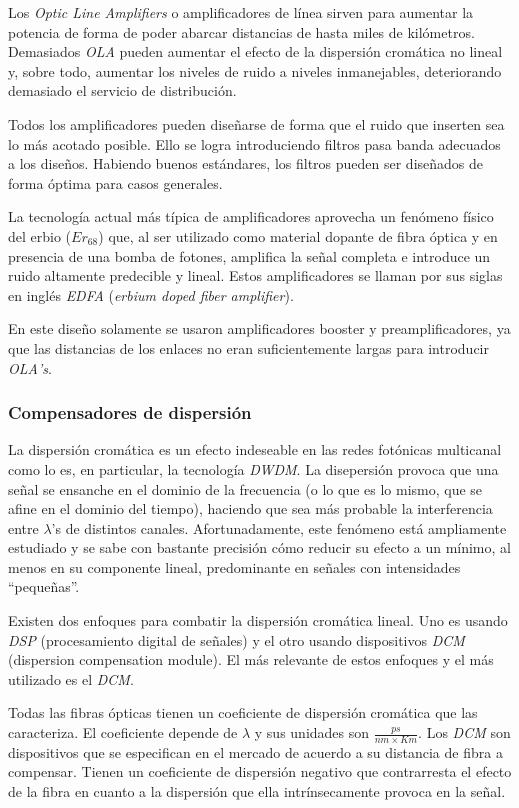 Los \emph{Optic Line Amplifiers} o amplificadores de línea sirven para
aumentar la potencia de forma de poder abarcar distancias de hasta miles
de kilómetros. Demasiados \emph{OLA} pueden aumentar el efecto de la
dispersión cromática no lineal y, sobre todo, aumentar los niveles de
ruido a niveles inmanejables, deteriorando demasiado el servicio de
distribución.

Todos los amplificadores pueden diseñarse de forma que el ruido que
inserten sea lo más acotado posible. Ello se logra introduciendo
filtros pasa banda adecuados a los diseños. Habiendo buenos
estándares, los filtros pueden ser diseñados de forma óptima para
casos generales.

La tecnología actual más típica de amplificadores aprovecha un
fenómeno físico del erbio ($Er_{68}$) que, al ser utilizado como
material dopante de fibra óptica y en presencia de una bomba de
fotones, amplifica la señal completa e introduce un ruido altamente
predecible y lineal. Estos amplificadores se llaman por sus siglas en
inglés \emph{EDFA} (\emph{erbium doped fiber amplifier}).

En este diseño solamente se usaron amplificadores booster y
preamplificadores, ya que las distancias de los enlaces no eran
suficientemente largas para introducir \emph{OLA's}.

\subsubsection{Compensadores de dispersión}
\label{sec:dispersion}

La dispersión cromática es un efecto indeseable en las redes fotónicas
multicanal como lo es, en particular, la tecnología \emph{DWDM}. La
disepersión provoca que una señal se ensanche en el dominio de la
frecuencia (o lo que es lo mismo, que se afine en el dominio del
tiempo), haciendo que sea más probable la interferencia entre
$\lambda$'s de distintos canales. Afortunadamente, este fenómeno está
ampliamente estudiado y se sabe con bastante precisión cómo reducir su
efecto a un mínimo, al menos en su componente lineal, predominante en
señales con intensidades ``pequeñas''.

Existen dos enfoques para combatir la dispersión cromática lineal. Uno
es usando \emph{DSP} (procesamiento digital de señales) y el otro
usando dispositivos \emph{DCM} (dispersion compensation module). El
más relevante de estos enfoques y el más utilizado es el \emph{DCM}.

Todas las fibras ópticas tienen un coeficiente de dispersión cromática
que las caracteriza. El coeficiente depende de $\lambda$ y sus
unidades son $\frac{ps}{nm \times Km}$. Los \emph{DCM} son
dispositivos que se especifican en el mercado de acuerdo a su
distancia de fibra a compensar. Tienen un coeficiente de dispersión
negativo que contrarresta el efecto de la fibra en cuanto a la
dispersión que ella intrínsecamente provoca en la señal.

